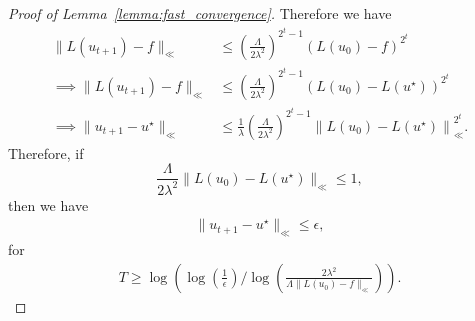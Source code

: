 \begin{proof}[Proof of Lemma~\ref{lemma:fast_convergence}]
    Therefore we have
    \begin{align*}
         \|L(u_{t+1}) - f\|_{\ll}
         &\leq
         \left(\frac{\Lambda}{2\lambda^2}\right)^{2^t - 1}
         \left(L(u_0) - f\right)^{2^t}\\
         \implies
         \|L(u_{t+1}) - f\|_{\ll}
         &\leq
         \left(\frac{\Lambda}{2\lambda^2}\right)^{2^t - 1}
         \left(L(u_0) - L(u^\star)\right)^{2^t}\\
         \implies
         \|u_{t+1} - u^\star\|_{\ll}
         &\leq
         \frac{1}{\lambda}\left(\frac{\Lambda}{2\lambda^2}\right)^{2^t - 1}
         \left\|L(u_0) - L(u^\star)\right\|_{\ll}^{2^t}.
    \end{align*}
    Therefore, if 
    $$\frac{\Lambda}{2\lambda^2}\|L(u_0) - L(u^\star)\|_{\ll}\leq 1,$$
    then we have 
    \begin{align*}
         \|u_{t+1} - u^\star\|_{\ll}
         \leq \epsilon,
    \end{align*}
    for
   \begin{align*}
       T \geq \log 
       \left(
           \log \left(\frac{1}{\epsilon}\right) 
           /
           \log \left(\frac{2\lambda^2}{\Lambda\|L(u_0) - f\|_{\ll}}\right)
        \right).
   \end{align*}
\end{proof}

